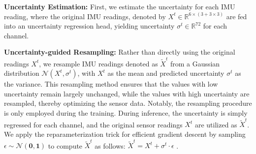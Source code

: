 \documentclass[letterpaper]{article} %
\begin{document}
\textbf{Uncertainty Estimation:}
First, we estimate the uncertainty for each IMU reading, where the original IMU readings, denoted by $X^{t} \in \mathbb{R}^{6\times(3+3\times3)}$ are fed into an uncertainty regression head, yielding uncertainty $\sigma^{t} \in \mathbb{R}^{72}$ for each channel.

\textbf{Uncertainty-guided Resampling:}
Rather than directly using the original readings $X^{t}$, we resample IMU readings denoted as $\widetilde{X}^{t}$ from a Gaussian distribution $\mathcal{N}(X^{t}, \sigma^{t})$, with $X^{t}$ as the mean and predicted uncertainty $\sigma^{t}$ as the variance. This resampling method ensures that the values with low uncertainty remain largely unchanged, while the values with high uncertainty are resampled, thereby optimizing the sensor data.
Notably, the resampling procedure is only employed during the training. During inference, the uncertainty is simply regressed for each channel, and the original sensor readings $X^{t}$ are utilized as $\widetilde{X}^{t}$.
We apply the reparameterization trick \cite{kingma2022autoencoding} for efficient gradient descent by sampling $\epsilon \sim\mathcal{N}(\textbf{0},\textbf{1})$ to compute $\widetilde{X}^{t}$ as follows: $\widetilde{X}^{t} =X^{t}+\sigma^{t} \cdot \epsilon$ .
\end{document}
